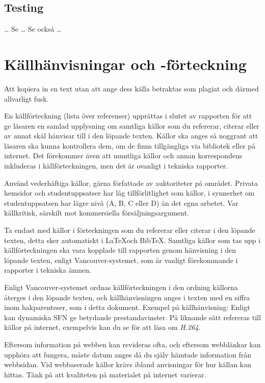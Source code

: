 \subsection{Testing}
\noindent
\dots
Se  \dots
Se också  \dots


\section{Källhänvisningar och -förteckning}
\label{sec:references}
\noindent
Att kopiera in en text utan att ange dess källa betraktas som plagiat och 
därmed allvarligt fusk.

En källförteckning (lista över referenser) upprättas i slutet av rapporten för 
att ge läsaren en samlad upplysning om samtliga källor som du refererar, 
citerar eller av annat skäl hänvisar till i den löpande texten.
Källor ska anges så noggrant att läsaren ska kunna kontrollera dem, om de finns 
tillgängliga via bibliotek eller på internet.
Det förekommer även att muntliga källor och annan korrespondens inkluderas 
i källförteckningen, men det är ovanligt i tekniska rapporter.

Använd vederhäftiga källor, gärna författade av auktoriteter på området.
Privata hemsidor och studentuppsatser har låg tillförlitlighet som källor, 
i synnerhet om studentuppsatsen har lägre nivå (A, B, C eller D) än det egna 
arbetet.
Var källkritisk, särskilt mot kommersiella försäljningsargument.

Ta endast med källor i förteckningen som du refererar eller citerar i den 
löpande texten, detta sker automatiskt i \LaTeX och Bib\TeX.
Samtliga källor som tas upp i källförteckningen ska vara kopplade till 
rapporten genom hänvisning i den löpande texten, enligt Vancouver-systemet, som 
är vanligt förekommande i rapporter i tekniska ämnen.

Enligt Vancouver-systemet ordnas källförteckningen i den ordning källorna 
återges i den löpande texten, och källhänvisningen anges i texten med en siffra 
inom hakparenteser, som i detta dokument.
Exempel på källhänvisning:
Enligt kan dynamiska SFN ge betydande prestandavinster.
På liknande sätt refereras till källor på internet, exempelvis kan du se 
för att läsa om \emph{H.264}.

Eftersom information på webben kan revideras ofta, och eftersom webblänkar kan 
upphöra att fungera, måste datum anges då du själv hämtade information från 
webbsidan.
Vid webbaserade källor krävs ibland anvisningar för hur källan kan hittas. Tänk 
på att kvaliteten på materialet på internet varierar.


